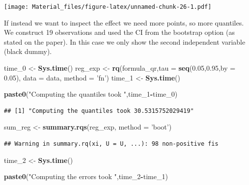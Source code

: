 \documentclass[]{book}
\newenvironment{Shaded}{\begin{snugshade}}{\end{snugshade}}
\newcommand{\KeywordTok}[1]{\textcolor[rgb]{0.13,0.29,0.53}{\textbf{#1}}}
\newcommand{\DataTypeTok}[1]{\textcolor[rgb]{0.13,0.29,0.53}{#1}}
\newcommand{\DecValTok}[1]{\textcolor[rgb]{0.00,0.00,0.81}{#1}}
\newcommand{\FloatTok}[1]{\textcolor[rgb]{0.00,0.00,0.81}{#1}}
\newcommand{\StringTok}[1]{\textcolor[rgb]{0.31,0.60,0.02}{#1}}
\newcommand{\OperatorTok}[1]{\textcolor[rgb]{0.81,0.36,0.00}{\textbf{#1}}}
\newcommand{\NormalTok}[1]{#1}
\begin{document}
\texttt{[image: Material\_files/figure-latex/unnamed-chunk-26-1.pdf]}

If instead we want to inspect the effect we need more points, so more
quantiles. We construct 19 observations and used the CI from the
bootstrap option (as stated on the paper). In this case we only show the
second independent variable (black dummy).

\begin{Shaded}
\begin{Highlighting}[]
\NormalTok{time_}\DecValTok{0}\NormalTok{ <-}\StringTok{ }\KeywordTok{Sys.time}\NormalTok{()}
\NormalTok{reg_exp <-}\StringTok{ }\KeywordTok{rq}\NormalTok{(formula_qr,}\DataTypeTok{tau =} \KeywordTok{seq}\NormalTok{(}\FloatTok{0.05}\NormalTok{,}\FloatTok{0.95}\NormalTok{,}\DataTypeTok{by =} \FloatTok{0.05}\NormalTok{), }\DataTypeTok{data =}\NormalTok{ data, }\DataTypeTok{method =} \StringTok{'fn'}\NormalTok{)}
\NormalTok{time_}\DecValTok{1}\NormalTok{ <-}\StringTok{ }\KeywordTok{Sys.time}\NormalTok{()}

\KeywordTok{paste0}\NormalTok{(}\StringTok{"Computing the quantiles took "}\NormalTok{,time_}\DecValTok{1}\OperatorTok{-}\NormalTok{time_}\DecValTok{0}\NormalTok{)}
\end{Highlighting}
\end{Shaded}

\begin{verbatim}
## [1] "Computing the quantiles took 30.5315752029419"
\end{verbatim}

\begin{Shaded}
\begin{Highlighting}[]
\NormalTok{sum_reg <-}\StringTok{ }\KeywordTok{summary.rqs}\NormalTok{(reg_exp, }\DataTypeTok{method =} \StringTok{'boot'}\NormalTok{)}
\end{Highlighting}
\end{Shaded}

\begin{verbatim}
## Warning in summary.rq(xi, U = U, ...): 98 non-positive fis
\end{verbatim}

\begin{Shaded}
\begin{Highlighting}[]
\NormalTok{time_}\DecValTok{2}\NormalTok{ <-}\StringTok{ }\KeywordTok{Sys.time}\NormalTok{()}

\KeywordTok{paste0}\NormalTok{(}\StringTok{"Computing the errors took "}\NormalTok{,time_}\DecValTok{2}\OperatorTok{-}\NormalTok{time_}\DecValTok{1}\NormalTok{)}
\end{Highlighting}
\end{Shaded}
\end{document}
